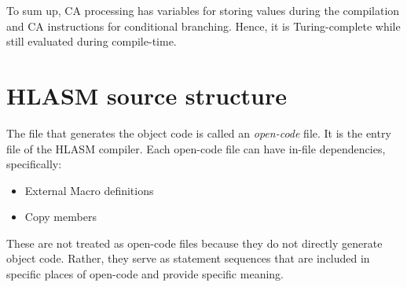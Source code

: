 To sum up, CA processing has variables for storing values during the compilation and CA instructions for conditional branching. Hence, it is Turing-complete while still evaluated during compile-time.

\section{HLASM source structure}

The file that generates the object code is called an \emph{open-code} file. It is the entry file of the HLASM compiler. Each open-code file can have in-file dependencies, specifically:
\begin{itemize}
	\item External Macro definitions
	\item Copy members
\end{itemize}
These are not treated as open-code files because they do not directly generate object code. Rather, they serve as statement sequences that are included in specific places of open-code and provide specific meaning.


